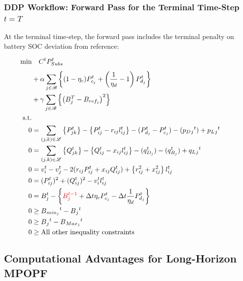 \subsubsection*{DDP Workflow: Forward Pass for the Terminal Time-Step $t = T$}

At the terminal time-step, the forward pass includes the terminal penalty on battery SOC deviation from reference:

\begin{gather}
    \begin{align}
        \min_{} 
        \vspace{-15ex}
        & \quad
        C^t P_{Subs}^t \\
        &+ \alpha \sum_{j \in \mathcal{B}} \left\{ (1- \eta_c)P_{c_j}^t + \left(\frac{1}{\eta_d}-1\right) P_{d_j}^t \right\} \nonumber\\
        &+ \gamma \sum_{j \in \mathcal{B}} \left\{ \left(B^{T}_{j} - B_{ref_{j}}\right)^2\right\} \nonumber\\
        \text{s.t.} & {}\nonumber\\
        {0} & = {\sum_{(j, k) \in \mathcal{L}} \left\{P_{jk}^t\right\} - \left\{P_{ij}^t - r_{ij}l_{ij}^t\right\} - (P_{d_j}^t - P_{c_j}^t)  - (p_D{_j}^t) + p_L{_j}^t} && \\
        {0} & = {\sum_{(j, k) \in \mathcal{L}} \left\{Q_{jk}^t\right\} - \left\{Q_{ij}^t - x_{ij}l_{ij}^t\right\} - (q_{D_j}^t) - (q_{B_j}^t) + q_L{_j}^t} && \\
        {0} & = {v_{i}^t - v_{j}^t - 2(r_{ij}P_{ij}^t + x_{ij}Q_{ij}^t) + \left\{r_{ij}^2 + x_{ij}^2\right\}l_{ij}^t}  && \\
        {0} & = {(P_{ij}^{t})^2 + (Q_{ij}^{t})^2 - v_{i}^t l_{ij}^t } \\
        {0} & = {B_{j}^{t} - \left\{ \textcolor{red}{ B_{j}^{t-1} } + \Delta t  \eta_c P_{c_j}^t - \Delta t\frac{1}{\eta_d} P_{d_j}^t \right\} } \\
        {0} & \geq {B{_{min_{j}}}^t - B{_j}^t} \\
        {0} & \geq {B{_j}^t - B{_{Max_{j}}}^t} \\
        {0} & \geq {\text{All other inequality constraints}}
    \end{align}
\end{gather}

\subsection{Computational Advantages for Long-Horizon MPOPF}

